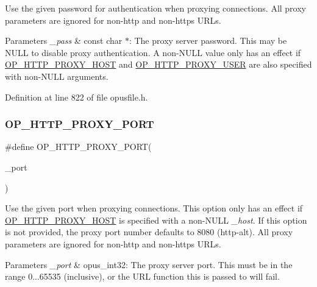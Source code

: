 Use the given password for authentication when proxying connections. All proxy parameters are ignored for non-\/http and non-\/https U\+R\+Ls. 
\begin{DoxyParams}{Parameters}
{\em \+\_\+pass} & const char $\ast$\+: The proxy server password. This may be {\ttfamily N\+U\+LL} to disable proxy authentication. A non-\/{\ttfamily N\+U\+LL} value only has an effect if \mbox{\hyperlink{group__url__options_gab3b517acdb74c0d0b51800af86a58876}{O\+P\+\_\+\+H\+T\+T\+P\+\_\+\+P\+R\+O\+X\+Y\+\_\+\+H\+O\+ST}} and \mbox{\hyperlink{group__url__options_gaf0ce8d761ff48697fa0c44a62a445842}{O\+P\+\_\+\+H\+T\+T\+P\+\_\+\+P\+R\+O\+X\+Y\+\_\+\+U\+S\+ER}} are also specified with non-\/{\ttfamily N\+U\+LL} arguments. \\
\hline
\end{DoxyParams}


Definition at line 822 of file opusfile.\+h.

\mbox{\label{group__url__options_ga838d23878f4135691684203baa75ed0c}} 
\subsubsection{\texorpdfstring{OP\_HTTP\_PROXY\_PORT}{OP\_HTTP\_PROXY\_PORT}}
{\footnotesize\ttfamily \#define O\+P\+\_\+\+H\+T\+T\+P\+\_\+\+P\+R\+O\+X\+Y\+\_\+\+P\+O\+RT(\begin{DoxyParamCaption}\item[{}]{\+\_\+port }\end{DoxyParamCaption})}

Use the given port when proxying connections. This option only has an effect if \mbox{\hyperlink{group__url__options_gab3b517acdb74c0d0b51800af86a58876}{O\+P\+\_\+\+H\+T\+T\+P\+\_\+\+P\+R\+O\+X\+Y\+\_\+\+H\+O\+ST}} is specified with a non-\/{\ttfamily N\+U\+LL} {\itshape \+\_\+host}. If this option is not provided, the proxy port number defaults to 8080 (http-\/alt). All proxy parameters are ignored for non-\/http and non-\/https U\+R\+Ls. 
\begin{DoxyParams}{Parameters}
{\em \+\_\+port} & {\ttfamily opus\+\_\+int32}\+: The proxy server port. This must be in the range 0...65535 (inclusive), or the U\+RL function this is passed to will fail. \\
\hline
\end{DoxyParams}


